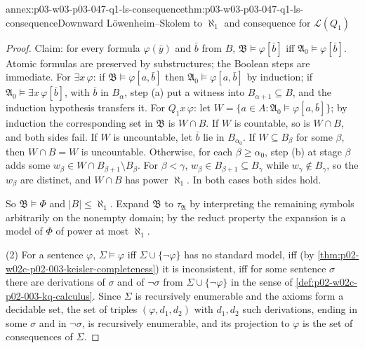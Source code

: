 \begin{annexitem}{annex:p03-w03-p03-047-q1-ls-consequence}{thm:p03-w03-p03-047-q1-ls-consequence}{Downward L\"owenheim--Skolem to \(\aleph_1\) and consequence for \(\mathscr L(Q_1)\)}
\begin{proof}
Claim: for every formula \(\varphi(\bar y)\) and \(\bar b\) from \(B\),
\(\mathfrak B\models\varphi[\bar b]\) iff \(\mathfrak A_0\models\varphi[\bar b]\).
Atomic formulas are preserved by substructures; the Boolean steps are
immediate.  For \(\exists x\,\varphi\): if \(\mathfrak B\models\varphi[a,\bar b]\)
then \(\mathfrak A_0\models\varphi[a,\bar b]\) by induction; if
\(\mathfrak A_0\models\exists x\,\varphi[\bar b]\), with \(\bar b\) in
\(B_\alpha\), step (a) put a witness into \(B_{\alpha+1}\subseteq B\), and
the induction hypothesis transfers it.  For \(Q_1x\,\varphi\): let
\(W=\{a\in A:\mathfrak A_0\models\varphi[a,\bar b]\}\); by induction the
corresponding set in \(\mathfrak B\) is \(W\cap B\).  If \(W\) is countable,
so is \(W\cap B\), and both sides fail.  If \(W\) is uncountable, let
\(\bar b\) lie in \(B_{\alpha_0}\).  If \(W\subseteq B_\beta\) for some
\(\beta\), then \(W\cap B=W\) is uncountable.  Otherwise, for each
\(\beta\ge\alpha_0\), step (b) at stage \(\beta\) adds some
\(w_\beta\in W\cap B_{\beta+1}\setminus B_\beta\).  For
\(\beta<\gamma\), \(w_\beta\in B_{\beta+1}\subseteq B_\gamma\) while
\(w_\gamma\notin B_\gamma\), so the \(w_\beta\) are distinct, and
\(W\cap B\) has power \(\aleph_1\).  In both cases both sides hold.

So \(\mathfrak B\models\Phi\) and \(|B|\le\aleph_1\).  Expand \(\mathfrak B\)
to \(\tau_{\mathfrak A}\) by interpreting the remaining symbols arbitrarily
on the nonempty domain; by the reduct property the expansion is a model of
\(\Phi\) of power at most \(\aleph_1\).

(2) For a sentence \(\varphi\), \(\Sigma\models\varphi\) iff
\(\Sigma\cup\{\neg\varphi\}\) has no standard model, iff (by
\cref{thm:p02-w02c-p02-003-keisler-completeness}) it is inconsistent, iff for
some sentence \(\sigma\) there are derivations of \(\sigma\) and of
\(\neg\sigma\) from \(\Sigma\cup\{\neg\varphi\}\) in the sense of
\cref{def:p02-w02c-p02-003-kq-calculus}.  Since \(\Sigma\) is recursively
enumerable and the axioms form a decidable set, the set of triples
\((\varphi,d_1,d_2)\) with \(d_1,d_2\) such derivations, ending in some
\(\sigma\) and in \(\neg\sigma\), is recursively enumerable, and its
projection to \(\varphi\) is the set of consequences of \(\Sigma\).
\end{proof}
\end{annexitem}

